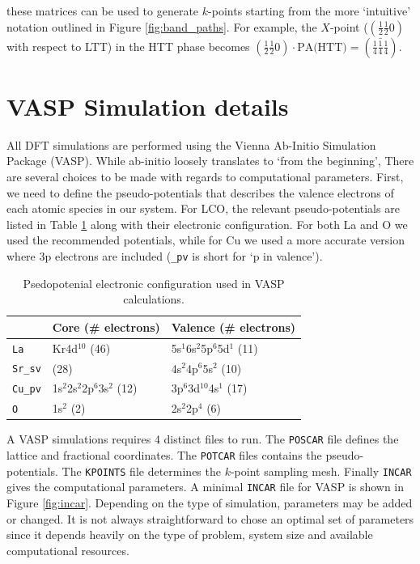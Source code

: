 \noindent these matrices can be used to generate $k$-points starting from the more `intuitive' notation outlined in Figure \ref{fig:band_paths}. For example, the $X$-point ($(\frac{1}{2} \frac{1}{2} 0)$ with respect to LTT) in the HTT phase becomes $(\frac{1}{2} \frac{1}{2} 0) \cdot \text{PA(HTT)} = (\frac{1}{4} \bar{\frac{1}{4}} \frac{1}{4})$.

\section{VASP Simulation details}
All DFT simulations are performed using the Vienna Ab-Initio Simulation Package (VASP). While ab-initio loosely translates to `from the beginning', There are several choices to be made with regards to computational parameters. First, we need to define the pseudo-potentials that describes the valence electrons of each atomic species in our system. For LCO, the relevant pseudo-potentials are listed in Table \ref{tab:vasp_pseudo} along with their electronic configuration. For both La and O we used the recommended potentials, while for Cu we used a more accurate version where 3p electrons are included (\verb|_pv| is short for `p in valence').


\begin{table}[b]
\centering
\begin{tabular}{@{}lll@{}}
\toprule
 & Core (\# electrons) & Valence (\# electrons)                        \\ \midrule
\texttt{La}                 & Kr4d$^{10}$ (46)                & 5s$^1$6s$^2$5p$^6$5d$^1$ (11) \\
\texttt{Sr\_sv} & (28) & 4s$^2$4p$^6$5s$^2$ (10) \\
\texttt{Cu\_pv}                 & 1s$^2$2s$^2$2p$^6$3s$^2$ (12) & 3p$^6$3d$^{10}$4s$^1$ (17)      \\
\texttt{O}                  & 1s$^2$ (2)                    & 2s$^2$2p$^4$ (6)              \\ \bottomrule
\end{tabular}
\caption[VASP Pseudopotentials]{Psedopotenial electronic configuration used in VASP calculations.}
\label{tab:vasp_pseudo}
\end{table}

A VASP simulations requires 4 distinct files to run. The \texttt{POSCAR} file defines the lattice and fractional coordinates. The \texttt{POTCAR} files contains the pseudo-potentials. The \texttt{KPOINTS} file determines the $k$-point sampling mesh. Finally \texttt{INCAR} gives the computational parameters. A minimal \texttt{INCAR} file for VASP is shown in Figure \ref{fig:incar}. Depending on the type of simulation, parameters may be added or changed. It is not always straightforward to chose an optimal set of parameters since it depends heavily on the type of problem, system size and available computational resources.


